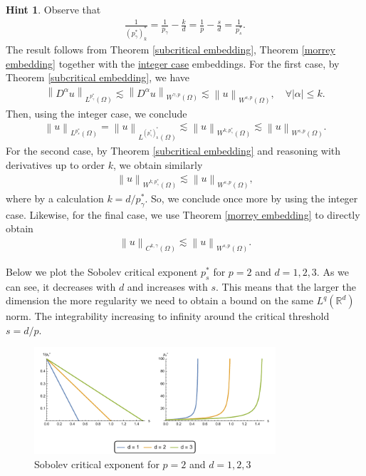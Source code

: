 \documentclass[
    a4paper,
    DIV=14,
    abstract=true,
    numbers=noenddot
]
{scrartcl}
\theoremstyle{definition}
\newtheorem*{hint}{Hint}
\renewcommand{\norm}[1]{\left\lVert #1 \right\rVert}\renewcommand{\abs}[1]{\left| #1 \right|}
\newcommand{\R}{\mathbb{R}}
\begin{document}
\begin{hint}
    Observe that
    \begin{align*}
        \frac{1}{(p_\gamma ^*)_k^*}=\frac{1}{p_\gamma }-\frac{k}{d}=\frac{1}{p}-\frac{s}{d}= \frac{1}{p_s^*}.
    \end{align*}
    The result follows from Theorem \ref{subcritical embedding},  Theorem \ref{morrey embedding} together with the \href{https://nowheredifferentiable.com/2023-07-12-PDEs-3-Sobolev_spaces/#est32:~:text=three%20results%20gives-,Theorem%2013,-(Rellich%2DKondrachov).%20Let}{integer case} embeddings. For the first case, by Theorem \ref{subcritical embedding}, we have
    \begin{align*}
        \norm{D^\alpha u}_{L^{p_\gamma ^*}(\Omega )}\lesssim \norm{D^\alpha u}_{W^{\gamma ,p}(\Omega )} \lesssim \norm{u}_{W^{s,p}(\Omega )}, \quad \forall \abs{\alpha}\leq k.
    \end{align*}
    Then, using the integer case, we conclude
    \begin{align*}
        \norm{u}_{L^{p_s^*}(\Omega )}=\norm{u}_{L^{(p_\gamma ^*)_k ^*}(\Omega )}\lesssim \norm{u}_{W^{k,p_\gamma ^*}(\Omega )}\lesssim \norm{u}_{W^{s,p}(\Omega )}.
    \end{align*}
    For the second case, by Theorem \ref{subcritical embedding} and reasoning with derivatives up to order $k$, we obtain similarly
    \begin{align*}
        \norm{u}_{W^{k,p_\gamma ^*}(\Omega )}\lesssim \norm{u}_{W^{s,p}(\Omega )},
    \end{align*}
    where by a calculation $k = d / p_\gamma ^*$. So, we conclude once more by using the integer case. Likewise, for the final case, we use Theorem \ref{morrey embedding} to directly obtain
    \begin{align*}
        \norm{u}_{C^{k,\gamma}(\Omega )}\lesssim \norm{u}_{W^{s,p}(\Omega )}.
    \end{align*}
\end{hint}
Below we plot the Sobolev critical exponent $p_s^*$ for $p=2$ and $d=1,2,3$. As we can see, it decreases with $d$ and increases with $s$. This means that the larger the dimension the more regularity we need to obtain a bound on the same $L^q(\R^d)$ norm. The integrability increasing to infinity around the critical threshold $s=d/p$.
\begin{figure}[htbp]
    \centering
    \includegraphics[width=0.8\textwidth]{regularity_coefficient.pdf}
    \caption{Sobolev critical exponent for $p=2$ and $d=1,2,3$  }
    \label{fig:regularity_coefficient}
\end{figure}
\end{document}
